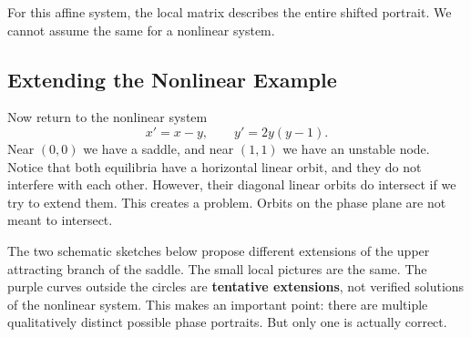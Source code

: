 \documentclass[10pt,letterpaper]{article}
\begin{document}
For this affine system, the local matrix describes the entire shifted portrait. We cannot assume the same for a nonlinear system.


\subsection{Extending the Nonlinear Example}
Now return to the nonlinear system
\[
x'=x-y,\qquad y'=2y(y-1).
\]
Near $(0,0)$ we have a saddle, and near $(1,1)$ we have an unstable node. Notice that both equilibria have a horizontal linear orbit, and they do not interfere with each other. However, their diagonal linear orbits do intersect if we try to extend them. This creates a problem. Orbits on the phase plane are not meant to intersect.

The two schematic sketches below propose different extensions of the upper attracting branch of the saddle. The small local pictures are the same. The purple
curves outside the circles are \textbf{tentative extensions}, not verified
solutions of the nonlinear system. This makes an important point: there are multiple qualitatively distinct possible phase portraits. But only one is actually correct.
\end{document}
